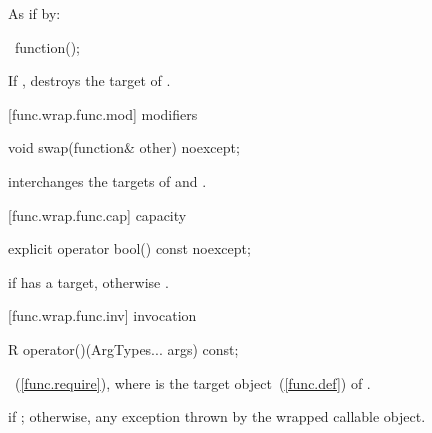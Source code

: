 \begin{itemdescr}
\pnum\effects As if by: 

\pnum
\returns {}
\end{itemdescr}

%
\begin{itemdecl}
~function();
\end{itemdecl}

\begin{itemdescr}
\pnum\effects If , destroys the target of .
\end{itemdescr}

[func.wrap.func.mod]{ modifiers}

%
\begin{itemdecl}
void swap(function& other) noexcept;
\end{itemdecl}

\begin{itemdescr}
\pnum\effects interchanges the targets of  and .
\end{itemdescr}

[func.wrap.func.cap]{ capacity}

%
\begin{itemdecl}
explicit operator bool() const noexcept;
\end{itemdecl}

\begin{itemdescr}
\pnum
\returns {} if  has a target, otherwise .
\end{itemdescr}

[func.wrap.func.inv]{ invocation}

%
%
\begin{itemdecl}
R operator()(ArgTypes... args) const;
\end{itemdecl}

\begin{itemdescr}
\pnum
\returns {}~(\ref{func.require}),
where  is the target object~(\ref{func.def}) of .

\pnum\throws
{} if ; otherwise, any
exception thrown by the wrapped callable object.
\end{itemdescr}

